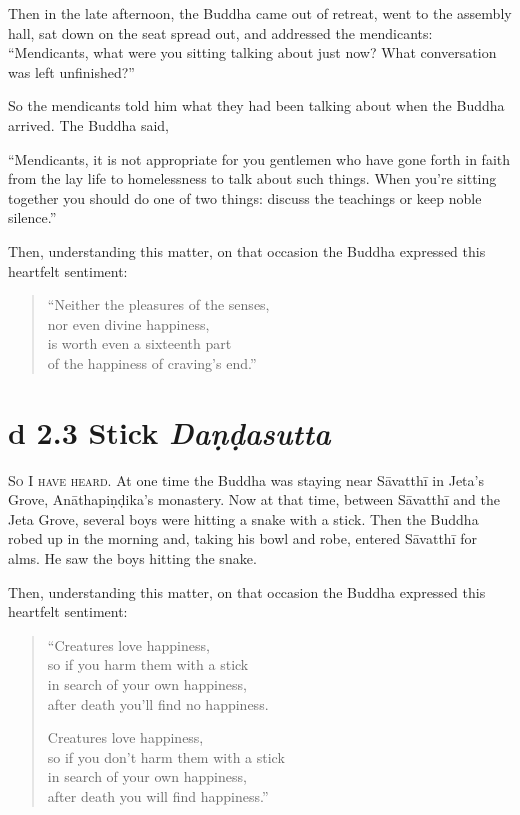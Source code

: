\documentclass[12pt,openany]{book}%
\newcommand*{\suttatitleacronym}[1]{\smaller[2]{#1}\vspace*{.3em}}
\newcommand*{\suttatitletranslation}[1]{\linebreak{#1}}
\newcommand*{\suttatitleroot}[1]{\linebreak\smaller[2]\itshape{#1}}
\newcommand*{\tocacronym}[1]{\hspace*{-3.3em}{#1}\quad}
\newcommand*{\toctranslation}[1]{#1}
\newcommand*{\tocroot}[1]{(\textit{#1})}
\newcommand*{\scevam}[1]{\textsc{#1}}
\begin{document}
Then in the late afternoon, the Buddha came out of retreat, went to the assembly hall, sat down on the seat spread out, and addressed the mendicants: “Mendicants, what were you sitting talking about just now? What conversation was left unfinished?” 

So the mendicants told him what they had been talking about when the Buddha arrived. The Buddha said, 

“Mendicants, it is not appropriate for you gentlemen who have gone forth in faith from the lay life to homelessness to talk about such things. When you’re sitting together you should do one of two things: discuss the teachings or keep noble silence.” 

Then, understanding this matter, on that occasion the Buddha expressed this heartfelt sentiment: 

\begin{verse}%
“Neither the pleasures of the senses, \\
nor even divine happiness, \\
is worth even a sixteenth part \\
of the happiness of craving’s end.” 

%
\end{verse}

%
\section*{{\suttatitleacronym Ud 2.3}{\suttatitletranslation A Stick }{\suttatitleroot Daṇḍasutta}}
\addcontentsline{toc}{section}{\tocacronym{Ud 2.3} \toctranslation{A Stick } \tocroot{Daṇḍasutta}}

\scevam{So I have heard. }At one time the Buddha was staying near \textsanskrit{Sāvatthī} in Jeta’s Grove, \textsanskrit{Anāthapiṇḍika}’s monastery. Now at that time, between \textsanskrit{Sāvatthī} and the Jeta Grove, several boys were hitting a snake with a stick. Then the Buddha robed up in the morning and, taking his bowl and robe, entered \textsanskrit{Sāvatthī} for alms. He saw the boys hitting the snake. 

Then, understanding this matter, on that occasion the Buddha expressed this heartfelt sentiment: 

\begin{verse}%
“Creatures love happiness, \\
so if you harm them with a stick \\
in search of your own happiness, \\
after death you’ll find no happiness. 

Creatures love happiness, \\
so if you don’t harm them with a stick \\
in search of your own happiness, \\
after death you will find happiness.” 

%
\end{verse}
\end{document}
